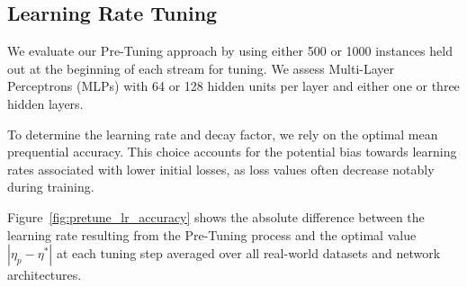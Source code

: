 \documentclass{article} %
\begin{document}
\subsection{Learning Rate Tuning}

We evaluate our Pre-Tuning approach by using either 500 or 1000 instances held out at the beginning of each stream for tuning. We assess Multi-Layer Perceptrons (MLPs) with 64 or 128 hidden units per layer and either one or three hidden layers.

To determine the learning rate and decay factor, we rely on the optimal mean prequential accuracy. This choice accounts for the potential bias towards learning rates associated with lower initial losses, as loss values often decrease notably during training.

Figure~\ref{fig:pretune_lr_accuracy} shows the absolute difference between the learning rate resulting from the Pre-Tuning process and the optimal value $|\eta_p - \eta^*|$ at each tuning step averaged over all real-world datasets and network architectures.
\end{document}
